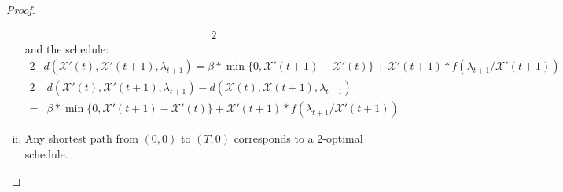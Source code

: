 \documentclass[hidelinks]{article}
\theoremstyle{plain}
\theoremstyle{definition}
\theoremstyle{rem}
\begin{document}
\begin{sloppypar}
\begin{proof}
\begin{enumerate}[(i)]
\begin{alignat*}{2}
	\end{alignat*}
	and the schedule:	
	\begin{alignat*}{2}
		&d(\mathcal{X}'(t),\mathcal{X}'(t+1),\lambda_{t+1})=\beta*\min\bigl\{0,\mathcal{X}'(t+1)-\mathcal{X}'(t)\bigr\}+\mathcal{X}'(t+1)*f(\lambda_{t+1}/\mathcal{X}'(t+1))
	\end{alignat*}
	\begin{alignat*}{2}
		&d(\mathcal{X}'(t),\mathcal{X}'(t+1),\lambda_{t+1})-d(\mathcal{X}(t),\mathcal{X}(t+1),\lambda_{t+1})\\
		=&\beta*\min\bigl\{0,\mathcal{X}'(t+1)-\mathcal{X}'(t)\bigr\}+\mathcal{X}'(t+1)*f(\lambda_{t+1}/\mathcal{X}'(t+1))
	\end{alignat*}


	\item Any shortest path from $(0,0)$ to $(T,0)$ corresponds to a $2$-optimal schedule.
\end{enumerate}
\end{proof}

\end{sloppypar}
\end{document}

